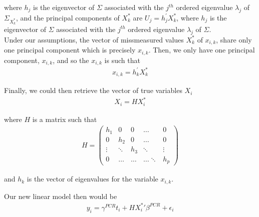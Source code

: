 \documentclass[12pt]{article}
\begin{document}
    where $h_j$ is the eigenvector of $\Sigma$ associated with the $j^{t h}$ ordered eigenvalue $\lambda_{j}$ of $\Sigma_{X^*_k}$, and the principal components of $X^*_k$ are $U_{j}=h_{j}^{\prime} X^*_k$, where $h_{j}$ is the eigenvector of $\Sigma$ associated with the $j^{t h}$ ordered eigenvalue $\lambda_{j}$ of $\Sigma$.\\

    Under our assumptions, the vector of missmeasured values $X^*_k$ of $x_{i,k}$, share only one principal component which is precisely $x_{i,k}$. Then, we only have one principal component, $x_{i,k}$, and so the $x_{i,k}$ is such that
    \begin{align}
        x_{i,k}=h_{k}^{\prime} X^*_k
    \end{align}

    Finally, we could then retrieve the vector of true variables $X_i$
    \begin{align}
        X_i=HX^*_i
    \end{align}

    where $H$ is a matrix such that
    \begin{align*}
        H=\left(\begin{array}{ccccc}
    h_1 & 0 & 0 & \dots & 0 \\
    0 & h_2 & 0 & \dots & 0 \\
    \vdots & \ddots & h_3 & \ddots & \vdots \\
    0 & \dots & \dots & \dots \ddots & h_p
    \end{array}\right)
    \end{align*}

    and $h_k$ is the vector of eigenvalues for the variable $x_{i,k}$.

    Our new linear model then would be
    \begin{align}
        y_i = \gamma^{PCR} t_i + H{X^*_i}'\beta^{PCR} + \epsilon_i
    \end{align}
\end{document}
